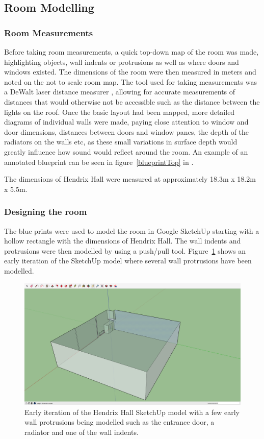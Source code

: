 \documentclass[../../main.tex]{subfiles}
\begin{document}
	\subsection{Room Modelling}

		\subsubsection{Room Measurements}

			Before taking room measurements, a quick top-down map of the room was made, highlighting objects, wall indents or protrusions as well as where doors and windows existed. The dimensions of the room were then measured in meters and noted on the not to scale room map. The tool used for taking measurements was a DeWalt laser distance measurer \cite{dewalt}, allowing for accurate measurements of distances that would otherwise not be accessible such as the distance between the lights on the roof. Once the basic layout had been mapped, more detailed diagrams of individual walls were made, paying close attention to window and door dimensions, distances between doors and window panes, the depth of the radiators on the walls etc, as these small variations in surface depth would greatly influence how sound would reflect around the room. An example of an annotated blueprint can be seen in figure~\ref{blueprintTop} in .

			The dimensions of Hendrix Hall were measured at approximately 18.3m x 18.2m x 5.5m.

		\subsubsection{Designing the room}
			\label{designRoom}
			The blue prints were used to model the room in Google SketchUp starting with a hollow rectangle with the dimensions of Hendrix Hall. The wall indents and protrusions were then modelled by using a push/pull tool. Figure~\ref{sku1} shows an early iteration of the SketchUp model where several wall protrusions have been modelled.

			\begin{figure}[ht]
				\center\includegraphics[scale = 0.2]{Sections/Implementation/Modelling/images/sku1.png}
				\caption{Early iteration of the Hendrix Hall SketchUp model with a few early wall protrusions being modelled such as the entrance door, a radiator and one of the wall indents.}
				\label{sku1}
			\end{figure}
\end{document}
